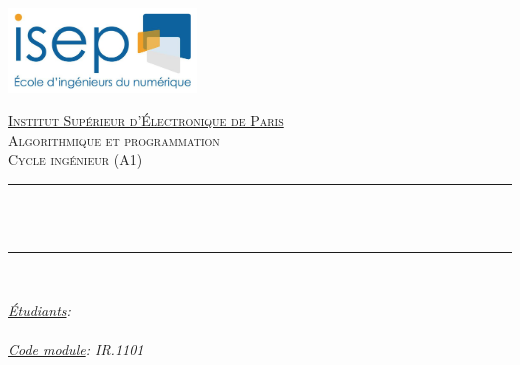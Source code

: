 \begin{titlepage}

\newcommand{\HRule}{\rule{\linewidth}{0.5mm}} %

\center
\includegraphics[width=5cm]{Title/logoISEP.png}\\[1cm] %
 

\center %


\textsc{\LARGE \underline{Institut Supérieur d'Électronique de Paris}} \\[1.5cm] %
\textsc{\Large Algorithmique et programmation}\\[0.5cm] %
    \textsc{\Large Cycle ingénieur (A1)}\\[0.05cm]


\makeatletter
\HRule \\[0.4cm]
{ \huge \bfseries \@title}\\[0.4cm] %
\HRule \\[1.5cm]
 

\begin{minipage}{0.4\textwidth}
\begin{flushleft} \large
\emph{\underline{Étudiants}:}\\
\@author %
\\[1.2em]
\emph{\underline{Code module}: IR.1101}\\


\end{flushleft}
\end{minipage}
\end{titlepage}
